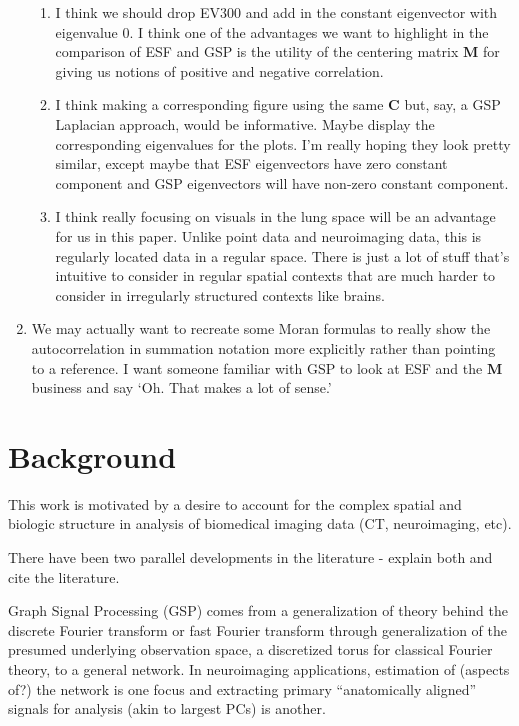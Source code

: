 \documentclass[12pt]{article}
\begin{document}
\begin{enumerate}[$\bullet$]
	      \begin{enumerate}
		      \item I think we should drop EV300 and add in the constant eigenvector with eigenvalue 0. I think one of the advantages we want to highlight in the comparison of ESF and GSP is the utility of the centering matrix $\mathbf M$ for giving us notions of positive and negative correlation.
		      \item I think making a corresponding figure using the same $\mathbf C$ but, say, a GSP Laplacian approach, would be informative. Maybe display the corresponding eigenvalues for the plots. I'm really hoping they look pretty similar, except maybe that ESF eigenvectors have zero constant component and GSP eigenvectors will have non-zero constant component.
		      \item I think really focusing on visuals in the lung space will be an advantage for us in this paper. Unlike point data and neuroimaging data, this is regularly located data in a regular space. There is just a lot of stuff that's intuitive to consider in regular spatial contexts that are much harder to consider in irregularly structured contexts like brains.
	      \end{enumerate}
	\item We may actually want to recreate some Moran formulas to really show the autocorrelation in summation notation more explicitly rather than pointing to a reference. I want someone familiar with GSP to look at ESF and the $\mathbf M$ business and say `Oh. That makes a lot of sense.'
\end{enumerate}


\section{Background}

This work is motivated by a desire to account for the complex spatial and biologic structure in analysis of biomedical imaging data (CT, neuroimaging, etc).

There have been two parallel developments in the literature - explain both and cite the literature.

Graph Signal Processing (GSP) comes from a generalization of theory behind the discrete Fourier transform or fast Fourier transform through generalization of the presumed underlying observation space, a discretized torus for classical Fourier theory, to a general network. In neuroimaging applications, estimation of (aspects of?) the network is one focus and extracting primary ``anatomically aligned'' signals for analysis (akin to largest PCs) is another.
\end{document}
